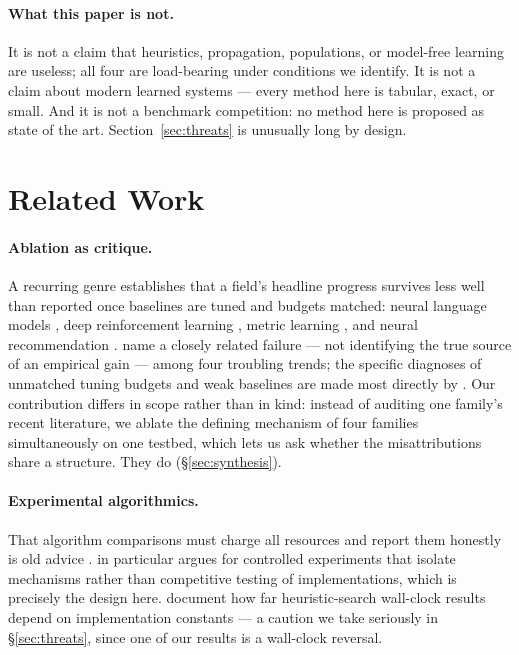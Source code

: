 \documentclass[11pt]{article}
\begin{document}
\paragraph{What this paper is not.} It is not a claim that heuristics, propagation, populations,
or model-free learning are useless; all four are load-bearing under conditions we identify. It is
not a claim about modern learned systems --- every method here is tabular, exact, or small.
And it is not a benchmark competition: no method here is proposed as state of the art.
Section~\ref{sec:threats} is unusually long by design.

\section{Related Work}

\paragraph{Ablation as critique.} A recurring genre establishes that a field's headline progress
survives less well than reported once baselines are tuned and budgets matched: neural language
models \citep{melis2018state}, deep reinforcement learning \citep{henderson2018deep}, metric
learning \citep{musgrave2020metric}, and neural recommendation \citep{dacrema2019areweb}. \citet{lipton2019troubling} name a
closely related failure --- not identifying the true source of an empirical gain --- among four
troubling trends; the specific diagnoses of unmatched tuning budgets and weak baselines are made
most directly by \citet{sculley2018winners}. Our contribution differs
in scope rather than in kind: instead of auditing one family's recent literature, we ablate the
defining mechanism of four families simultaneously on one testbed, which lets us ask whether the
misattributions share a structure. They do (\S\ref{sec:synthesis}).

\paragraph{Experimental algorithmics.} That algorithm comparisons must charge all resources and
report them honestly is old advice \citep{hooker1995testing, johnson2002theoretician,
mcgeoch2012guide}. \citet{hooker1995testing} in particular argues for controlled experiments that
isolate mechanisms rather than competitive testing of implementations, which is precisely the
design here. \citet{burns2012implementing} document how far heuristic-search wall-clock results
depend on implementation constants --- a caution we take seriously in \S\ref{sec:threats}, since
one of our results is a wall-clock reversal.
\end{document}
